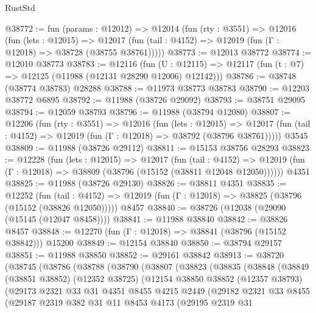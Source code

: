 \begin{lexlean}{RustStd}
\begin{coremodule}
@38772 := fun (params : @12012) =>
  @12014
    (fun (rty : @3551) =>
    @12016
      (fun (lets : @12015) =>
      @12017 (fun (tail : @4152) => @12019 (fun (Γ : @12018) => @38728 (@38755 @38761)))))
@38773 := @12013 @38772
@38774 := @12010 @38773
@38783 := @12116
    (fun (U : @12115) => @12117 (fun (t : @7) => @12125 (@11988 (@12131 @28290 @12006) @12142)))
@38786 := @38748 (@38774 @38783) @28288
@38788 := @11973 @38773 @38783
@38790 := @12203 @38772 @6895
@38792 := @11988 (@38726 @29092)
@38793 := @38751 @29095
@38794 := @12059 @38793
@38796 := @11988 (@38794 @12080)
@38807 := @12206
    (fun (rty : @3551) =>
    @12016
      (fun (lets : @12015) =>
      @12017 (fun (tail : @4152) => @12019 (fun (Γ : @12018) => @38792 (@38796 @38761)))))
    @3545
@38809 := @11988 (@38726 @29112)
@38811 := @15153 @38756 @28293
@38823 := @12228
    (fun (lets : @12015) =>
    @12017
      (fun (tail : @4152) =>
      @12019 (fun (Γ : @12018) => @38809 (@38796 (@15152 (@38811 @12048 @12050))))))
    @4351
@38825 := @11988 (@38726 @29130)
@38826 := @38811 @4351
@38835 := @12252
    (fun (tail : @4152) => @12019 (fun (Γ : @12018) => @38825 (@38796 (@15152 (@38826 @12050)))))
    @8457
@38840 := @38726 (@12038 (@29090 (@15145 (@12047 @8458))))
@38841 := @11988 @38840
@38842 := @38826 @8457
@38848 := @12270 (fun (Γ : @12018) => @38841 (@38796 (@15152 @38842))) @15200
@38849 := @12154 @38840
@38850 := @38794 @29157
@38851 := @11988 @38850
@38852 := @29161 @38842
@38913 := @38720
    (@38745
      (@38786
        (@38788
          (@38790
            (@38807
              (@38823
                (@38835
                  (@38848
                    (@38849
                      (@38851 @38852)
                      (@12352 @38725)
                      (@12154
                        @38850
                        @38852
                        (@12357 @38793)
                        (@29173
                          @2321
                          @33
                          @31
                          @4351
                          @8455
                          @4215
                          @2449
                          (@29182
                            @2321
                            @33
                            @8455
                            (@29187
                              @2319
                              @382
                              @31
                              @11
                              @8453
                              @4173
                              (@29195
                                @2319
                                @31

\end{coremodule}
\end{lexlean}
